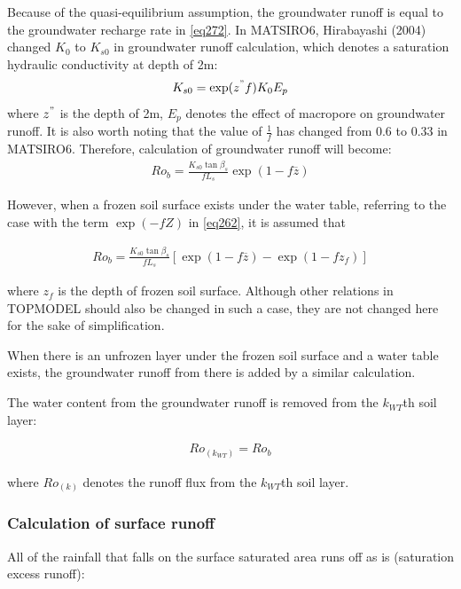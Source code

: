 Because of the quasi-equilibrium assumption, the groundwater runoff is equal to the groundwater recharge rate in \ref{eq272}. In MATSIRO6, Hirabayashi (2004) changed \(K_0\) to
\(K_{s0}\) in groundwater runoff calculation, which denotes a saturation hydraulic conductivity at depth of 2m: \begin{eqnarray}
K_{s0}=\exp (z^"f)K_0 E_p
\end{eqnarray} where \(z^"\) is the depth of 2m, \(E_p\) denotes the effect of macropore on groundwater runoff. It is also worth noting that the value of \(\frac1f\) has changed from 0.6 to 0.33 in MATSIRO6.
Therefore, calculation of groundwater runoff will become: \begin{eqnarray}
Ro_b = \frac{K_{s0} \tan\beta_s}{f L_s}\exp(1-f \overline{z})
\label{eq280}
\end{eqnarray}

However, when a frozen soil surface exists under the water table, referring to the case with the term \(\exp(-fZ)\) in \ref{eq262}, it is assumed that

\begin{eqnarray}
Ro_b = \frac{K_{s0} \tan\beta_s}{f L_s}
  [ \exp(1-f \overline{z}) - \exp(1-f z_f) ]
  \label{eq281}
\end{eqnarray}

where \(z_f\) is the depth of frozen soil surface. Although other relations in TOPMODEL should also be changed in such a case, they are not changed here for the sake of simplification.

When there is an unfrozen layer under the frozen soil surface and a water table exists, the groundwater runoff from there is added by a similar calculation.

The water content from the groundwater runoff is removed from the \(k_{WT}\)th soil layer:

\begin{eqnarray}
Ro_{(k_{WT})} = Ro_b
\label{eq282}
\end{eqnarray}

where \(Ro_{(k)}\) denotes the runoff flux from the \(k_{WT}\)th soil layer.

\hypertarget{calculation-of-surface-runoff}{%
\subsubsection{Calculation of surface runoff}\label{calculation-of-surface-runoff}}

All of the rainfall that falls on the surface saturated area runs off as is (saturation excess runoff):

